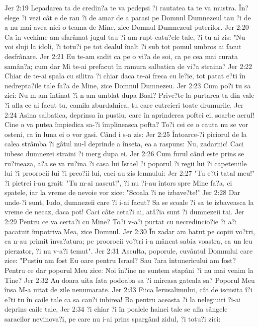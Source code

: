Jer 2:19  Lepadarea ta de credin?a te va pedepsi ?i rautatea ta te va mustra. În?elege ?i vezi cât e de rau ?i de amar de a parasi pe Domnul Dumnezeul tau ?i de a nu mai avea nici o teama de Mine, zice Domnul Dumnezeul puterilor.
Jer 2:20  Ca în vechime am sfarâmat jugul tau ?i am rupt catu?ele tale, ?i tu ai zis: "Nu voi sluji la idoli, ?i totu?i pe tot dealul înalt ?i sub tot pomul umbros ai facut desfrânare.
Jer 2:21  Eu te-am sadit ca pe o vi?a de soi, ca pe cea mai curata samân?a; cum dar Mi te-ai prefacut în ramura salbatica de vi?a straina?
Jer 2:22  Chiar de te-ai spala cu silitra ?i chiar daca te-ai freca cu le?ie, tot patat e?ti în nedrepta?ile tale fa?a de Mine, zice Domnul Dumnezeu.
Jer 2:23  Cum po?i tu sa zici: Nu m-am întinat ?i n-am umblat dupa Baal? Prive?te la purtarea ta din vale ?i afla ce ai facut tu, camila zburdalnica, tu care cutreieri toate drumurile,
Jer 2:24  Asina salbatica, deprinsa în pustiu, care în aprinderea poftei ei, soarbe aerul! Cine o va putea împiedica sa-?i împlineasca pofta? To?i cei ce o cauta nu se vor osteni, ca în luna ei o vor gasi. Când i s-a zis:
Jer 2:25  Întoarce-?i piciorul de la calea strâmba ?i gâtul nu-l deprinde a înseta, ea a raspuns: Nu, zadarnic! Caci iubesc dumnezei straini ?i merg dupa ei.
Jer 2:26  Cum furul când este prins se ru?ineaza, a?a se va ru?ina ?i casa lui Israel ?i poporul ?i regii lui ?i capeteniile lui ?i proorocii lui ?i preo?ii lui, caci au zis lemnului:
Jer 2:27  "Tu e?ti tatal meu!" ?i pietrei i-au grait: "Tu m-ai nascut!", ?i nu ?i-au întors spre Mine fa?a, ci spatele, iar la vreme de nevoie vor zice: "Scoala ?i ne izbave?te!"
Jer 2:28  Dar unde-?i sunt, Iudo, dumnezeii care ?i i-ai facut? Sa se scoale ?i sa te izbaveasca la vreme de necaz, daca pot! Caci câte ceta?i ai, atâ?ia sunt ?i dumnezeii tai.
Jer 2:29  Pentru ce va certa?i cu Mine? To?i v-a?i purtat cu necredincio?ie ?i a?i pacatuit împotriva Mea, zice Domnul.
Jer 2:30  În zadar am batut pe copiii vo?tri, ca n-au primit înva?atura; pe proorocii vo?tri i-a mâncat sabia voastra, ca un leu pierzator, ?i nu v-a?i temut".
Jer 2:31  Asculta, poporule, cuvântul Domnului care zice: "Pustiu am fost Eu oare pentru Israel? Sau ?ara întunericului am fost? Pentru ce dar poporul Meu zice: Noi în?ine ne suntem stapâni ?i nu mai venim la Tine?
Jer 2:32  Au doara uita fata podoaba sa ?i mireasa gateala sa? Poporul Meu însa M-a uitat de zile nenumarate.
Jer 2:33  Fiica Ierusalimului, cât de iscusita î?i e?ti tu în caile tale ca sa cau?i iubirea! Ba pentru aceasta ?i la nelegiuiri ?i-ai deprins caile tale,
Jer 2:34  ?i chiar ?i în poalele hainei tale se afla sângele saracilor nevinova?i, pe care nu i-ai prins spargând zidul, ?i totu?i zici:
